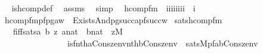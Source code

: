 \begin{isabellebody}
%
\isadelimproof
\ \ %
\endisadelimproof
%
\isatagproof
{}\isamarkupfalse%
\ is{\isacharunderscore}{\kern0pt}hcomp{\isacharunderscore}{\kern0pt}def\ \isamarkupfalse%
\ assms\ \isamarkupfalse%
\ simp%
\endisatagproof
{\isafoldproof}%
%
\isadelimproof
\isanewline
%
\endisadelimproof
\isanewline
{}\isamarkupfalse%
\isanewline
\ \ hcomp{\isacharunderscore}{\kern0pt}fm\ {\isacharcolon}{\kern0pt}{\isacharcolon}{\kern0pt}\ {\isachardoublequoteopen}{\isacharbrackleft}{\kern0pt}i{\isasymRightarrow}i{\isasymRightarrow}i{\isacharcomma}{\kern0pt}i{\isasymRightarrow}i{\isasymRightarrow}i{\isacharcomma}{\kern0pt}i{\isacharcomma}{\kern0pt}i{\isacharbrackright}{\kern0pt}\ {\isasymRightarrow}\ i{\isachardoublequoteclose}\ \isanewline
\ \ {\isachardoublequoteopen}hcomp{\isacharunderscore}{\kern0pt}fm{\isacharparenleft}{\kern0pt}pf{\isacharcomma}{\kern0pt}pg{\isacharcomma}{\kern0pt}a{\isacharcomma}{\kern0pt}w{\isacharparenright}{\kern0pt}\ {\isasymequiv}\ Exists{\isacharparenleft}{\kern0pt}And{\isacharparenleft}{\kern0pt}pg{\isacharparenleft}{\kern0pt}succ{\isacharparenleft}{\kern0pt}a{\isacharparenright}{\kern0pt}{\isacharcomma}{\kern0pt}{}{\isacharparenright}{\kern0pt}{\isacharcomma}{\kern0pt}pf{\isacharparenleft}{\kern0pt}{}{\isacharcomma}{\kern0pt}succ{\isacharparenleft}{\kern0pt}w{\isacharparenright}{\kern0pt}{\isacharparenright}{\kern0pt}{\isacharparenright}{\kern0pt}{\isacharparenright}{\kern0pt}{\isachardoublequoteclose}\isanewline
\isanewline
{}\isamarkupfalse%
\ sats{\isacharunderscore}{\kern0pt}hcomp{\isacharunderscore}{\kern0pt}fm{\isacharcolon}{\kern0pt}\isanewline
\ \ \ \isanewline
\ \ \ \ f{\isacharunderscore}{\kern0pt}iff{\isacharunderscore}{\kern0pt}sats{\isacharcolon}{\kern0pt}{\isachardoublequoteopen}{\isasymAnd}a\ b\ z{\isachardot}{\kern0pt}\ a{\isasymin}nat\ {\isasymLongrightarrow}\ b{\isasymin}nat\ {\isasymLongrightarrow}\ z{\isasymin}M\ {\isasymLongrightarrow}\ \isanewline
\ \ \ \ \ \ \ \ \ \ \ \ \ \ \ \ \ is{\isacharunderscore}{\kern0pt}f{\isacharparenleft}{\kern0pt}nth{\isacharparenleft}{\kern0pt}a{\isacharcomma}{\kern0pt}Cons{\isacharparenleft}{\kern0pt}z{\isacharcomma}{\kern0pt}env{\isacharparenright}{\kern0pt}{\isacharparenright}{\kern0pt}{\isacharcomma}{\kern0pt}nth{\isacharparenleft}{\kern0pt}b{\isacharcomma}{\kern0pt}Cons{\isacharparenleft}{\kern0pt}z{\isacharcomma}{\kern0pt}env{\isacharparenright}{\kern0pt}{\isacharparenright}{\kern0pt}{\isacharparenright}{\kern0pt}\ {\isasymlongleftrightarrow}\ sats{\isacharparenleft}{\kern0pt}M{\isacharcomma}{\kern0pt}pf{\isacharparenleft}{\kern0pt}a{\isacharcomma}{\kern0pt}b{\isacharparenright}{\kern0pt}{\isacharcomma}{\kern0pt}Cons{\isacharparenleft}{\kern0pt}z{\isacharcomma}{\kern0pt}env{\isacharparenright}{\kern0pt}{\isacharparenright}{\kern0pt}{\isachardoublequoteclose}\isanewline

\end{isabellebody}
